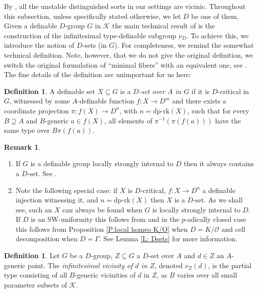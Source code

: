 \documentclass[11pt]{amsart}
\theoremstyle{definition}
\newtheorem{definition}[theorem]{Definition}
\newtheorem{remark}[theorem]{Remark}
\newcommand{\CK}{{\mathcal K}}
\newcommand{\CO}{{\mathcal O}}
\newcommand{\0}{\emptyset}
\def\dpr{\mathrm{dp\text{-}rk}}
\def\sub{\subseteq}
\begin{document}
By \cite[Fact 4.7]{HaHaPeGps}, all the unstable distinguished sorts in our settings are vicinic.
Throughout this subsection, unless specifically stated otherwise, we let $D$ be one of them. Given a definable $D$-group $G$ in $\CK$ the main technical result of \cite{HaHaPeGps} is the construction of the infinitesimal type-definable subgroup $\nu_D$. To achieve this, we introduce the notion of $D$-sets (in $G$). For completeness, we remind the somewhat technical definition. Note, however, that we do not give the original definition, we switch the original formulation  of ``minimal fibers'' with an equivalent one, see \cite[Remark 4.12]{HaHaPeGps}.  The fine details of the definition are unimportant for us here: 

\begin{definition}\cite[Definition 4.16]{HaHaPeGps}
    A definable set $X\subseteq G$ is a \emph{$D$-set over $A$ in $G$} if it is $D$-critical in $G$, witnessed by some $A$-definable function $f:X\to D^m$ and there exists a coordinate projection $\pi:f(X)\to D^n$, with $n=\dpr(X)$, such that for every $B\supseteq A$ and $B$-generic $a\in f(X)$, all elements of $\pi^{-1}(\pi(f(a)))$ have the same type over $B\pi(f(a))$.
\end{definition}

\begin{remark}\label{R: D-sets}
\begin{enumerate}
    \item If $G$ is a definable group locally strongly internal to $D$ then it always contains a $D$-set. See \cite[Remark 4.18]{HaHaPeGps}.
    \item Note the following special case: if $X$ is $D$-critical, $f: X\to D^n$ a definable injection witnessing it, and \underline{$n=\dpr(X)$} then $X$ is a $D$-set.  As we shall see, such an $X$ can always be found when $G$ is locally strongly internal to $D$. If $D$ is an SW-uniformity this follows from \cite[Proposition 4.6]{SimWal} and in the $p$-adically closed case this follows from Proposition \ref{P:local homeo K/O} when $D=K/\CO$ and cell decomposition when $D=\Gamma$. See Lemma \ref{L: Dsets} for more information.    
\end{enumerate}

\end{remark}


\begin{definition} 
Let $G$ be a $D$-group,  $Z\sub G$ a $D$-set over $A$ and $d\in Z$ an $A$-generic point.
The {\em infinitesimal vicinity of $d$ in $Z$},  denoted $\nu_Z(d)$, is the partial type consisting of all $B$-generic vicinities of $d$ in $Z$, as $B$ varies over all small parameter subsets of $\CK$.
\end{definition}
\end{document}
